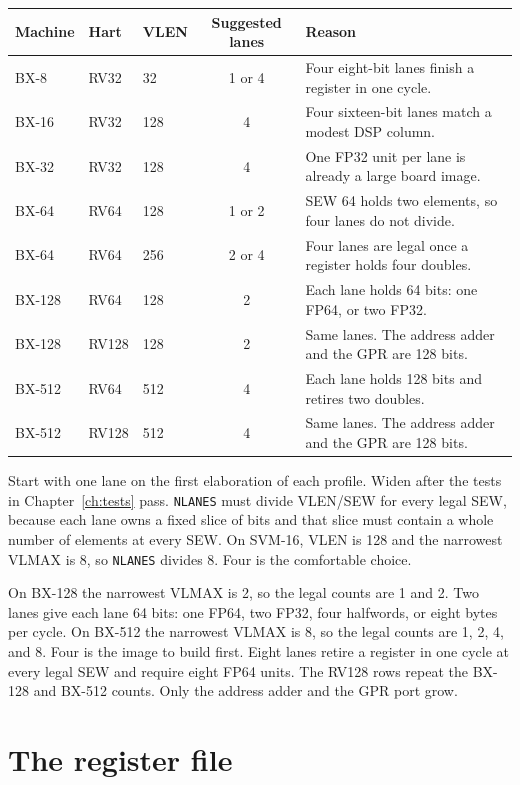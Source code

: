 \begin{center}
\begingroup
\scriptsize
\setlength{\tabcolsep}{4pt}
\begin{tabular}{@{}lllcp{5.4cm}@{}}
\toprule
Machine & Hart & VLEN & Suggested lanes & Reason \\
\midrule
BX-8   & RV32  & 32  & 1 or 4 & Four eight-bit lanes finish a register in one cycle. \\
BX-16  & RV32  & 128 & 4      & Four sixteen-bit lanes match a modest DSP column. \\
BX-32  & RV32  & 128 & 4      & One FP32 unit per lane is already a large board image. \\
BX-64  & RV64  & 128 & 1 or 2 & SEW 64 holds two elements, so four lanes do not divide. \\
BX-64  & RV64  & 256 & 2 or 4 & Four lanes are legal once a register holds four doubles. \\
BX-128 & RV64  & 128 & 2      & Each lane holds 64 bits: one FP64, or two FP32. \\
BX-128 & RV128 & 128 & 2      & Same lanes. The address adder and the GPR are 128 bits. \\
BX-512 & RV64  & 512 & 4      & Each lane holds 128 bits and retires two doubles. \\
BX-512 & RV128 & 512 & 4      & Same lanes. The address adder and the GPR are 128 bits. \\
\bottomrule
\end{tabular}
\endgroup
\end{center}

Start with one lane on the first elaboration of each profile. Widen after the tests in Chapter~\ref{ch:tests} pass. \texttt{NLANES} must divide VLEN/SEW for every legal SEW, because each lane owns a fixed slice of bits and that slice must contain a whole number of elements at every SEW. On SVM-16, VLEN is 128 and the narrowest VLMAX is 8, so \texttt{NLANES} divides 8. Four is the comfortable choice.

On BX-128 the narrowest VLMAX is 2, so the legal counts are 1 and 2. Two lanes give each lane 64 bits: one FP64, two FP32, four halfwords, or eight bytes per cycle. On BX-512 the narrowest VLMAX is 8, so the legal counts are 1, 2, 4, and 8. Four is the image to build first. Eight lanes retire a register in one cycle at every legal SEW and require eight FP64 units. The RV128 rows repeat the BX-128 and BX-512 counts. Only the address adder and the GPR port grow.

\section{The register file}

